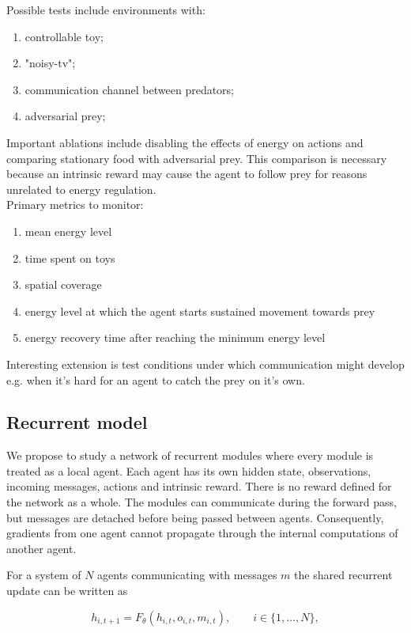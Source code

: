 Possible tests include environments with:
\begin{enumerate}
	\item controllable toy;
	\item "noisy-tv";
	\item communication channel between predators;
	\item adversarial prey;
\end{enumerate}

Important ablations include disabling the effects of energy on actions and comparing stationary food with adversarial prey. This comparison is necessary because an  intrinsic reward may cause the agent to follow prey for reasons unrelated to energy regulation.\\
Primary metrics to monitor:

\begin{enumerate}
	\item mean energy level
	\item time spent on toys
	\item spatial coverage
	\item energy level at which the agent starts sustained movement towards prey
    \item energy recovery time after reaching the minimum energy level
\end{enumerate}

Interesting extension is test conditions under which communication might develop e.g. when it's hard for an agent to catch the prey on it's own.

\subsection{Recurrent model}

We propose to study a network of recurrent modules where every module is treated as a local agent. Each agent has its own hidden state, observations, incoming messages, actions and intrinsic reward. There is no reward defined for the network as a whole. The modules can communicate during the forward pass, but messages are detached before being passed between agents. Consequently, gradients from one agent cannot propagate through the internal computations of another agent.

For a system of $N$ agents communicating with messages $m$ the shared recurrent update can be written as

\begin{equation}
h_{i,t+1} = F_{\theta}(h_{i,t}, o_{i,t}, m_{i,t}),
\qquad i \in \{1,\ldots,N\},
\end{equation}

